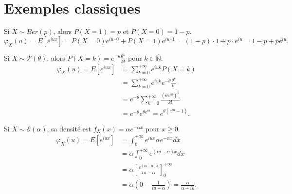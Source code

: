 \section{Exemples classiques}
\begin{example}
Si $X \sim Ber(p)$, alors $P(X=1) = p$ et $P(X=0) = 1-p$.
\[ \varphi_X(u) = E[e^{iux}] = P(X=0)e^{iu \cdot 0} + P(X=1)e^{iu \cdot 1} = (1-p) \cdot 1 + p \cdot e^{iu} = 1-p+pe^{iu}. \]
\end{example}
\begin{example}
Si $X \sim \mathcal{P}(\theta)$, alors $P(X=k) = e^{-\theta} \frac{\theta^k}{k!}$ pour $k \in \mathbb{N}$.
\begin{align*}
\varphi_X(u) = E[e^{iux}] &= \sum_{k=0}^{+\infty} e^{iuk} P(X=k) \\
&= \sum_{k=0}^{+\infty} e^{iuk} e^{-\theta} \frac{\theta^k}{k!} \\
&= e^{-\theta} \sum_{k=0}^{+\infty} \frac{(\theta e^{iu})^k}{k!} \\
&= e^{-\theta} e^{\theta e^{iu}} = e^{\theta(e^{iu}-1)}.
\end{align*}
\end{example}
\begin{example}
Si $X \sim \mathcal{E}(\alpha)$, sa densité est $f_X(x) = \alpha e^{-\alpha x}$ pour $x \ge 0$.
\begin{align*}
\varphi_X(u) = E[e^{iux}] &= \int_{0}^{+\infty} e^{iux} \alpha e^{-\alpha x} dx \\
&= \alpha \int_{0}^{+\infty} e^{(iu-\alpha)x} dx \\
&= \alpha \left[ \frac{e^{(iu-\alpha)x}}{iu-\alpha} \right]_{0}^{+\infty} \\
&= \alpha \left( 0 - \frac{1}{iu-\alpha} \right) = \frac{\alpha}{\alpha - iu}.
\end{align*}
\end{example}
